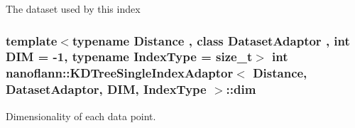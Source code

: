 The dataset used by this index \hypertarget{classnanoflann_1_1_k_d_tree_single_index_adaptor_a1b818d32a7f9c58bee114a25e3539969}{
\subsubsection[{dim}]{\setlength{\rightskip}{0pt plus 5cm}template$<$typename Distance , class Dataset\-Adaptor , int D\-I\-M = -\/1, typename Index\-Type  = size\-\_\-t$>$ int {\bf nanoflann\-::\-K\-D\-Tree\-Single\-Index\-Adaptor}$<$ Distance, Dataset\-Adaptor, D\-I\-M, Index\-Type $>$\-::dim\hspace{0.3cm}{\ttfamily [protected]}}}\label{classnanoflann_1_1_k_d_tree_single_index_adaptor_a1b818d32a7f9c58bee114a25e3539969}


Dimensionality of each data point. 

